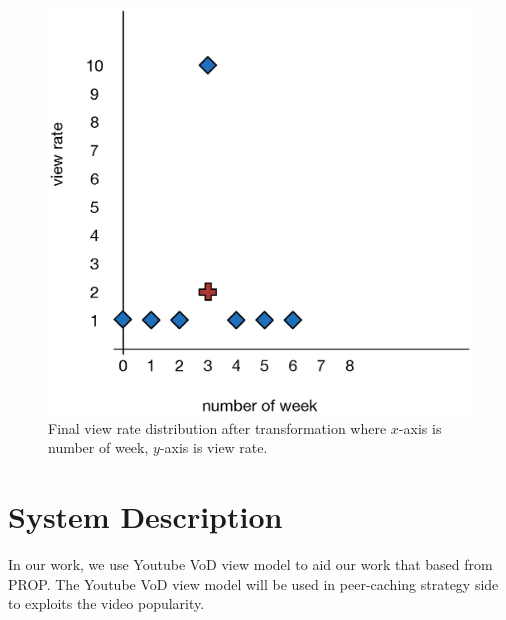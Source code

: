 \documentclass[10pt,final,journal,a4paper]{IEEEtran}
\begin{document}
\begin{figure}[!t]
\begin{center}
\includegraphics[scale=0.5]{graphs/transformasi2.eps}
\end{center}
\caption{Final view rate distribution after transformation where $x$-axis is number of week, $y$-axis is view rate.}
\label{fig:viewratedistexamplered}
\end{figure} 



\section{System Description}\label{systemdescription}
In our work, we use Youtube VoD view model to aid our work that based from PROP. 
The Youtube VoD view model will be used in peer-caching strategy side to exploits the video popularity. 
\end{document}
